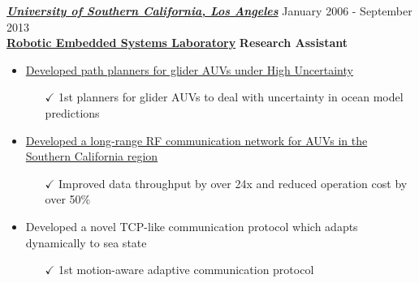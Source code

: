 \vspace{8pt}
{\sl \href{http://www.usc.edu}{\textbf{University of Southern California, Los Angeles}}} \hfill        January 2006 - September 2013 \\
\href{http://robotics.usc.edu/resl}{\textbf{Robotic Embedded Systems Laboratory}}       \hfill   \textbf{Research Assistant}
   \begin{itemize} \itemsep -2pt %
   \item \href{http://robotics.usc.edu/~ampereir/wordpress/?page_id=131}{Developed  path planners for glider AUVs under High Uncertainty} \itemsep -2pt
   \begin{itemize}\item[$\checkmark$]  \itemsep -8pt%
    1st planners for glider AUVs to deal with uncertainty in ocean model predictions 
    \iftoggle{detailedVersion}
    {\begin{itemize}\item[\tiny$\blacksquare$] Combines techniques from AI, Machine Learning and Robotics
   \item[\tiny$\blacksquare$] All code written in C++ and Python (STL, Boost, NumPy/SciPy)
   \item[\tiny$\blacksquare$] Used hardware parallelization and advanced data structures to speed up computations
    \end{itemize}
   } {}
   \end{itemize}
    
   \item \href{http://robotics.usc.edu/~ampereir/wordpress/?page_id=134}{Developed a long-range RF communication network for AUVs in the Southern California region}
   \begin{itemize} \item[$\checkmark$]Improved data throughput by over 24x and reduced operation cost by over 50\%
   \iftoggle{detailedVersion}{\begin{itemize}
   \item[\tiny$\blacksquare$]  Required Computer Networking, Embedded Systems and Signal Processing
   \item[\tiny$\blacksquare$]  All code written in C++ (both ARM and PC-based Linux) 
   \end{itemize}}{}
   \end{itemize}
   
    \item Developed a novel TCP-like communication protocol which adapts dynamically to sea state
   \begin{itemize} \item[$\checkmark$]1st motion-aware adaptive communication protocol
   \iftoggle{detailedVersion}{\begin{itemize}
   \item[\tiny$\blacksquare$]  Required Computer Networking, Reinforcement Learning and Signal Processing
   \item[\tiny$\blacksquare$]  All code written in C++ (both ARM and PC-based Linux) 
   \end{itemize}}{}
   \end{itemize}
   

\end{itemize}
